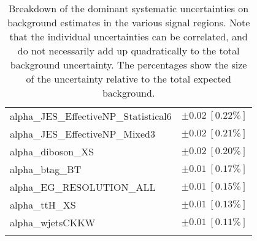 \begin{table}
\begin{center}
\begin{tabular*}{\textwidth}{@{\extracolsep{\fill}}lc}
alpha\_JES\_EffectiveNP\_Statistical6         & $\pm 0.02\ [0.22\%] $       \\
alpha\_JES\_EffectiveNP\_Mixed3         & $\pm 0.02\ [0.21\%] $       \\
alpha\_diboson\_XS         & $\pm 0.02\ [0.20\%] $       \\
alpha\_btag\_BT         & $\pm 0.01\ [0.17\%] $       \\
alpha\_EG\_RESOLUTION\_ALL         & $\pm 0.01\ [0.15\%] $       \\
alpha\_ttH\_XS         & $\pm 0.01\ [0.13\%] $       \\
alpha\_wjetsCKKW         & $\pm 0.01\ [0.11\%] $       \\
\noalign{\smallskip}\hline\noalign{\smallskip}
\end{tabular*}
\end{center}
\caption[Breakdown of uncertainty on background estimates]{
Breakdown of the dominant systematic uncertainties on background estimates in the various signal regions.
Note that the individual uncertainties can be correlated, and do not necessarily add up quadratically to 
the total background uncertainty. The percentages show the size of the uncertainty relative to the total expected background.
\label{table.results.bkgestimate.uncertainties.SRMMEM_mct2}}
\end{table}
%